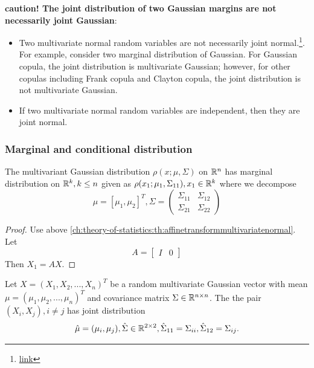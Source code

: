 \begin{refsection}
\begin{note}
\textbf{caution! The joint distribution of two Gaussian margins are not necessarily joint Gaussian}:
\begin{itemize}
	\item Two multivariate normal random variables are not necessarily joint normal.\footnote{\href{https://stats.stackexchange.com/questions/30159/is-it-possible-to-have-a-pair-of-gaussian-random-variables-for-which-the-joint-d}{link}}.
	For example, consider two marginal distribution of Gaussian. For Gaussian copula, the joint distribution is multivariate Gaussian; however, for other copulas including Frank copula and Clayton copula, the joint distribution is not multivariate Gaussian.
	\item If two multivariate normal random variables are independent, then they are joint normal.
\end{itemize}


\end{note}

\subsubsection{Marginal and conditional distribution}
\begin{lemma}\label{ch:theory-of-statistics:th:marginalDistributionOfMultivariateGaussain}
	\cite[41]{chirikjian2011stochastic1}The multivariant Gaussian distribution $\rho(x;\mu,\Sigma)$ on $\mathbb{R}^n$ has marginal distribution on $\mathbb{R}^k,k\leq n$ given as
	$\rho(x_1;\mu_1,\Sigma_{11}),x_1\in \mathbb{R}^k$
	where we decompose $$\mu = [\mu_1, \mu_2]^T,\Sigma = 
	\begin{pmatrix}
	\Sigma_{11} & \Sigma_{12} \\
	\Sigma_{21} & \Sigma_{22}
	\end{pmatrix}
	$$ 
\end{lemma}
\begin{proof}
	Use above \autoref{ch:theory-of-statistics:th:affinetransformmultivariatenormal}. Let $$A = \begin{bmatrix}
	I & 0
	\end{bmatrix}$$
	Then $X_1 = AX$.
\end{proof}


\begin{lemma}\label{ch:theory-of-statistics:th:MultivariateGaussainFulldistributionFromPairdistribution}
Let $X = (X_1,X_2,...,X_n)^T$ be a random multivariate Gaussian vector with mean $\mu = (\mu_1,\mu_2,...,\mu_n)^T$ and covariance matrix $\Sigma \in \mathbb{R}^{n\times n}$. The the pair $(X_i,X_j),i\neq j$ has joint distribution $$\hat{\mu} = (\mu_i,\mu_j), \hat{\Sigma}\in \mathbb{R}^{2\times 2}, \hat{\Sigma}_{11} = \Sigma_{ii},\hat{\Sigma}_{12} = \Sigma_{ij}.$$  


\end{lemma}
\end{refsection}

